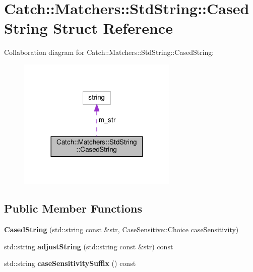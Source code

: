 \hypertarget{structCatch_1_1Matchers_1_1StdString_1_1CasedString}{}\section{Catch\+:\+:Matchers\+:\+:Std\+String\+:\+:Cased\+String Struct Reference}
\label{structCatch_1_1Matchers_1_1StdString_1_1CasedString}


Collaboration diagram for Catch\+:\+:Matchers\+:\+:Std\+String\+:\+:Cased\+String\+:
\nopagebreak
\begin{figure}[H]
\begin{center}
\leavevmode
\includegraphics[width=216pt]{structCatch_1_1Matchers_1_1StdString_1_1CasedString__coll__graph}
\end{center}
\end{figure}
\subsection*{Public Member Functions}
\begin{DoxyCompactItemize}
\item 
{\bfseries Cased\+String} (std\+::string const \&str, Case\+Sensitive\+::\+Choice case\+Sensitivity)\hypertarget{structCatch_1_1Matchers_1_1StdString_1_1CasedString_aa88bbc5acd2bff22351d8d4b1816b561}{}\label{structCatch_1_1Matchers_1_1StdString_1_1CasedString_aa88bbc5acd2bff22351d8d4b1816b561}

\item 
std\+::string {\bfseries adjust\+String} (std\+::string const \&str) const \hypertarget{structCatch_1_1Matchers_1_1StdString_1_1CasedString_a0ff84e194426c8f4bca0660b9180d20d}{}\label{structCatch_1_1Matchers_1_1StdString_1_1CasedString_a0ff84e194426c8f4bca0660b9180d20d}

\item 
std\+::string {\bfseries case\+Sensitivity\+Suffix} () const \hypertarget{structCatch_1_1Matchers_1_1StdString_1_1CasedString_a1113c80dd02967032a99290bdcd1b590}{}\label{structCatch_1_1Matchers_1_1StdString_1_1CasedString_a1113c80dd02967032a99290bdcd1b590}

\end{DoxyCompactItemize}

